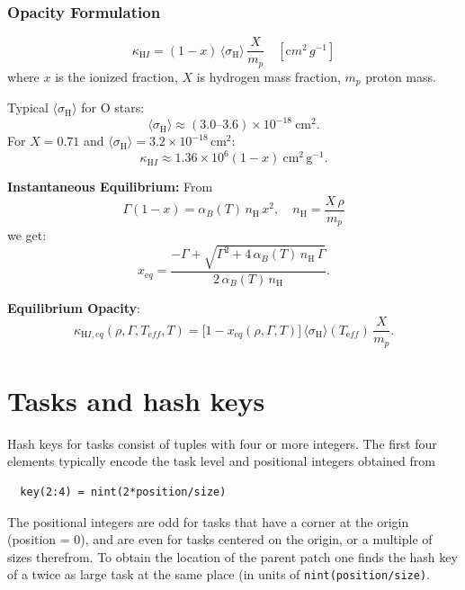 \documentclass[paper=a4,fontsize=11pt]{scrartcl}
\numberwithin{equation}{section}		%
\numberwithin{figure}{section}			%
\numberwithin{table}{section}				%
\newcommand{\codecolor}{\color{Blue}}
\begin{document}
\subsubsection{Opacity Formulation}

\begin{equation}
\kappa_{\mathrm HI} = (1-x)\,\langle\sigma_{\mathrm H}\rangle\,\frac{X}{m_p} \quad [{\mathrm cm^2\,g^{-1}}]
\end{equation}
where $x$ is the ionized fraction, $X$ is hydrogen mass fraction, $m_p$ proton mass.

Typical $\langle\sigma_{\mathrm H}\rangle$ for O stars:
\[
\langle\sigma_{\mathrm H}\rangle \approx (3.0\text{--}3.6)\times 10^{-18}\ \mathrm{cm}^2.
\]
For $X=0.71$ and $\langle\sigma_{\mathrm H}\rangle=3.2\times 10^{-18}$\,cm$^2$:
\[
\kappa_{\mathrm HI} \approx 1.36\times 10^6 (1-x)\ \mathrm{cm}^2\,\mathrm{g}^{-1}.
\]

\textbf{Instantaneous Equilibrium:}
From
\[
\Gamma(1-x) = \alpha_B(T)\,n_{\mathrm H}\,x^2, \quad n_{\mathrm H}=\frac{X\,\rho}{m_p}
\]
we get:
\begin{equation}
x_{\mathrm eq} = \frac{-\Gamma + \sqrt{\Gamma^2 + 4\,\alpha_B(T)\,n_{\mathrm H}\,\Gamma}}{2\,\alpha_B(T)\,n_{\mathrm H}}.
\end{equation}

\textbf{Equilibrium Opacity}:
\begin{equation}
\kappa_{\mathrm HI,eq}(\rho,\Gamma,T_{\mathrm eff},T) =
\big[1-x_{\mathrm eq}(\rho,\Gamma,T)\big] \,
\langle\sigma_{\mathrm H}\rangle(T_{\mathrm eff})\,\frac{X}{m_p}.
\end{equation}

\section{Tasks and hash keys}
Hash keys for tasks consist of tuples with four or more integers.  The first four elements typically encode the task level and positional integers obtained from
{\codecolor\small\begin{verbatim}
  key(2:4) = nint(2*position/size)
\end{verbatim}}
The positional integers are odd for tasks that have a corner at the origin (position = 0), and are even for tasks centered on the origin, or a multiple of sizes therefrom.  To obtain the location of the parent patch one finds the hash key of a twice as large task at the same place (in units of {\codecolor\verb'nint(position/size)'}.
\end{document}
